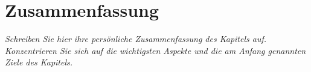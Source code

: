 \section{Zusammenfassung}

\textit{Schreiben Sie hier ihre persönliche Zusammenfassung des Kapitels auf. Konzentrieren Sie sich auf die wichtigsten Aspekte und die am Anfang genannten Ziele des Kapitels.}

\vspace*{10cm}




\printbibliography[segment=\therefsegment,heading=subbibliography]
